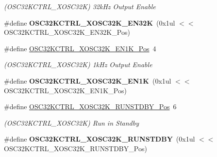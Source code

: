 \begin{DoxyCompactItemize}
\begin{DoxyCompactList}\small\item\em (O\+S\+C32\+K\+C\+T\+R\+L\+\_\+\+X\+O\+S\+C32\+K) 32k\+Hz Output Enable \end{DoxyCompactList}\item 
\hypertarget{group___s_a_m_l21___o_s_c32_k_c_t_r_l_ga1fa80f6c89dded8bc827e016e37a9ae8}{}\#define {\bfseries O\+S\+C32\+K\+C\+T\+R\+L\+\_\+\+X\+O\+S\+C32\+K\+\_\+\+E\+N32\+K}~(0x1ul $<$$<$ O\+S\+C32\+K\+C\+T\+R\+L\+\_\+\+X\+O\+S\+C32\+K\+\_\+\+E\+N32\+K\+\_\+\+Pos)\label{group___s_a_m_l21___o_s_c32_k_c_t_r_l_ga1fa80f6c89dded8bc827e016e37a9ae8}

\item 
\hypertarget{group___s_a_m_l21___o_s_c32_k_c_t_r_l_gade7145443f1f0bbd5705dce47e2e990e}{}\#define \hyperlink{group___s_a_m_l21___o_s_c32_k_c_t_r_l_gade7145443f1f0bbd5705dce47e2e990e}{O\+S\+C32\+K\+C\+T\+R\+L\+\_\+\+X\+O\+S\+C32\+K\+\_\+\+E\+N1\+K\+\_\+\+Pos}~4\label{group___s_a_m_l21___o_s_c32_k_c_t_r_l_gade7145443f1f0bbd5705dce47e2e990e}

\begin{DoxyCompactList}\small\item\em (O\+S\+C32\+K\+C\+T\+R\+L\+\_\+\+X\+O\+S\+C32\+K) 1k\+Hz Output Enable \end{DoxyCompactList}\item 
\hypertarget{group___s_a_m_l21___o_s_c32_k_c_t_r_l_ga76147ae9ecde38088720cf375ffc25c5}{}\#define {\bfseries O\+S\+C32\+K\+C\+T\+R\+L\+\_\+\+X\+O\+S\+C32\+K\+\_\+\+E\+N1\+K}~(0x1ul $<$$<$ O\+S\+C32\+K\+C\+T\+R\+L\+\_\+\+X\+O\+S\+C32\+K\+\_\+\+E\+N1\+K\+\_\+\+Pos)\label{group___s_a_m_l21___o_s_c32_k_c_t_r_l_ga76147ae9ecde38088720cf375ffc25c5}

\item 
\hypertarget{group___s_a_m_l21___o_s_c32_k_c_t_r_l_gaab719702395f394c3f8ab2a0862e3c62}{}\#define \hyperlink{group___s_a_m_l21___o_s_c32_k_c_t_r_l_gaab719702395f394c3f8ab2a0862e3c62}{O\+S\+C32\+K\+C\+T\+R\+L\+\_\+\+X\+O\+S\+C32\+K\+\_\+\+R\+U\+N\+S\+T\+D\+B\+Y\+\_\+\+Pos}~6\label{group___s_a_m_l21___o_s_c32_k_c_t_r_l_gaab719702395f394c3f8ab2a0862e3c62}

\begin{DoxyCompactList}\small\item\em (O\+S\+C32\+K\+C\+T\+R\+L\+\_\+\+X\+O\+S\+C32\+K) Run in Standby \end{DoxyCompactList}\item 
\hypertarget{group___s_a_m_l21___o_s_c32_k_c_t_r_l_ga8651bb51b712bcdeeed8dfce3edb1701}{}\#define {\bfseries O\+S\+C32\+K\+C\+T\+R\+L\+\_\+\+X\+O\+S\+C32\+K\+\_\+\+R\+U\+N\+S\+T\+D\+B\+Y}~(0x1ul $<$$<$ O\+S\+C32\+K\+C\+T\+R\+L\+\_\+\+X\+O\+S\+C32\+K\+\_\+\+R\+U\+N\+S\+T\+D\+B\+Y\+\_\+\+Pos)\label{group___s_a_m_l21___o_s_c32_k_c_t_r_l_ga8651bb51b712bcdeeed8dfce3edb1701}


\end{DoxyCompactItemize}
